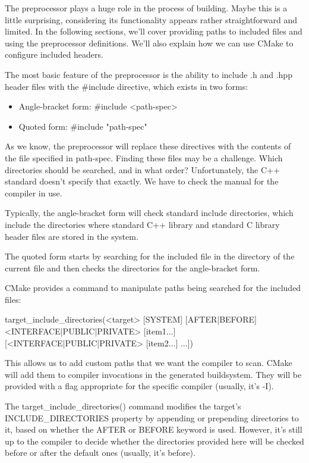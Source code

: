 
The preprocessor plays a huge role in the process of building. Maybe this is a little surprising, considering its functionality appears rather straightforward and limited. In the following sections, we’ll cover providing paths to included files and using the preprocessor definitions. We’ll also explain how we can use CMake to configure included headers.


The most basic feature of the preprocessor is the ability to include .h and .hpp header files with the \#include directive, which exists in two forms:

\begin{itemize}
\item
Angle-bracket form: \#include <path-spec>

\item
Quoted form: \#include "path-spec"
\end{itemize}

As we know, the preprocessor will replace these directives with the contents of the file specified in path-spec. Finding these files may be a challenge. Which directories should be searched, and in what order? Unfortunately, the C++ standard doesn’t specify that exactly. We have to check the manual for the compiler in use.

Typically, the angle-bracket form will check standard include directories, which include the directories where standard C++ library and standard C library header files are stored in the system.

The quoted form starts by searching for the included file in the directory of the current file and then checks the directories for the angle-bracket form.

CMake provides a command to manipulate paths being searched for the included files:

\begin{shell}
target_include_directories(<target> [SYSTEM] [AFTER|BEFORE]
                           <INTERFACE|PUBLIC|PRIVATE> [item1...]
                          [<INTERFACE|PUBLIC|PRIVATE> [item2...]
...])
\end{shell}

This allows us to add custom paths that we want the compiler to scan. CMake will add them to compiler invocations in the generated buildsystem. They will be provided with a flag appropriate for the specific compiler (usually, it’s -I).

The target\_include\_directories() command modifies the target’s INCLUDE\_DIRECTORIES property by appending or prepending directories to it, based on whether the AFTER or BEFORE keyword is used. However, it’s still up to the compiler to decide whether the directories provided here will be checked before or after the default ones (usually, it’s before).

